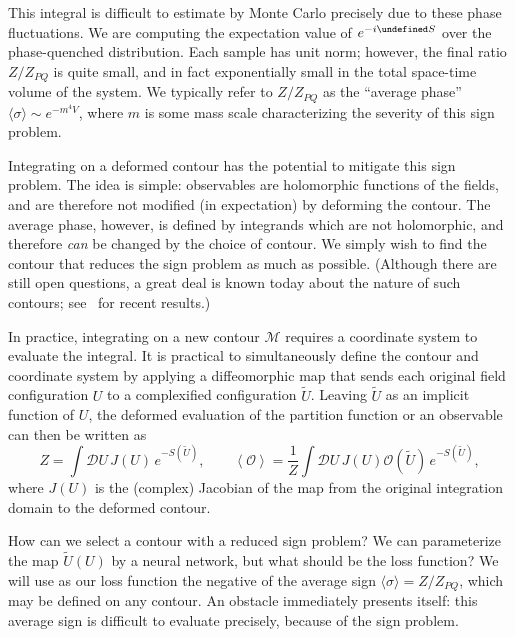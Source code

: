 \documentclass[12pt]{article}
\let\Im\undefined
\DeclareMathOperator{\Im}{Im}
\begin{document}
This integral is difficult to estimate by Monte Carlo precisely due to these phase fluctuations. We are computing the expectation value of $e^{-i \Im S}$ over the phase-quenched distribution. Each sample has unit norm; however, the final ratio $Z/Z_{PQ}$ is quite small, and in fact exponentially small in the total space-time volume of the system. We typically refer to $Z / Z_{PQ}$ as the ``average phase'' $\langle \sigma\rangle \sim e^{-m^4 V}$, where $m$ is some mass scale characterizing the severity of this sign problem.

Integrating on a deformed contour has the potential to mitigate this sign problem. The idea is simple: observables are holomorphic functions of the fields, and are therefore not modified (in expectation) by deforming the contour. The average phase, however, is defined by integrands which are not holomorphic, and therefore \emph{can} be changed by the choice of contour. We simply wish to find the contour that reduces the sign problem as much as possible. (Although there are still open questions, a great deal is known today about the nature of such contours; see~\cite{Lawrence:2023sfc} for recent results.)

In practice, integrating on a new contour $\mathcal{M}$ requires a coordinate system to evaluate the integral. It is practical to simultaneously define the contour and coordinate system by applying a diffeomorphic map that sends each original field configuration $U$ to a complexified configuration $\tilde{U}$. Leaving $\tilde{U}$ as an implicit function of $U$, the deformed evaluation of the partition function or an observable can then be written as
\begin{equation} \label{eq:Oave-manif-concrete}
Z = \int \mathcal{D}U \, J(U) \, e^{-S(\tilde{U})},
\qquad 
    \left<\mathcal{O}\right> = \frac{1}{Z} \int \mathcal{D}U \, J(U) \mathcal{O}(\tilde{U}) \, e^{-S(\tilde{U})},
\end{equation}
where $J(U)$ is the (complex) Jacobian of the map from the original integration domain to the deformed contour.

How can we select a contour with a reduced sign problem? We can parameterize the map $\tilde U(U)$ by a neural network, but what should be the loss function? We will use as our loss function the negative of the average sign $\langle \sigma\rangle = Z/Z_{PQ}$, which may be defined on any contour. An obstacle immediately presents itself: this average sign is difficult to evaluate precisely, because of the sign problem. 
\end{document}
